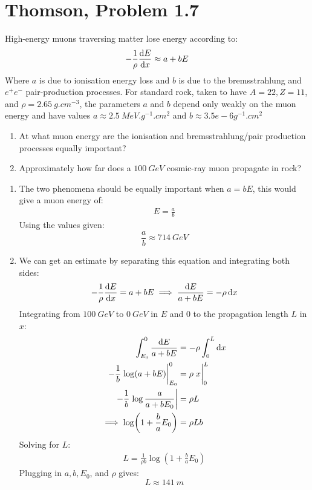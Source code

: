 \documentclass[12pt]{article}
\begin{document}
\section{Thomson, Problem 1.7}
\begin{problem}
  High-energy muons traversing matter lose energy according to:
  \begin{align*}
    -\frac1\rho\dv{E}{x}\approx a+bE
  \end{align*}
  Where $a$ is due to ionisation energy loss and $b$ is due to the bremsstrahlung and $e^+e^-$ pair-production processes. For standard rock, taken to have $A=22, Z=11$, and $\rho=\SI{2.65}{g.cm^{-3}}$, the parameters $a$ and $b$ depend only weakly on the muon energy and have values $a\approx\SI{2.5}{MeV.g^{-1}.cm^{2}}$ and $b\approx{3.5e-6}{g^{-1}.cm^{2}}$
  \begin{enumerate}[label = (\alph*)]
  \item At what muon energy are the ionisation and bremsstrahlung/pair production processes equally important?
  \item Approximately how far does a $\SI{100}{GeV}$ cosmic-ray muon propagate in rock?
  \end{enumerate}
\end{problem}
\begin{enumerate}[label = (\alph*)]
\item The two phenomena should be equally important when $a=bE$, this would give a muon energy of:
  \begin{align*}
    E=\frac{a}{b}
  \end{align*}
  Using the values given:
  \begin{equation}
    \label{eq:p3a}
    \frac{a}{b}\approx\SI{714}{GeV}
  \end{equation}
\item We can get an estimate by separating this equation and integrating both sides:
  \begin{align*}
    -\frac1\rho\dv{E}{x}=a+bE\implies
    \frac{\dd{E}}{a+bE}=-\rho\dd{x}
  \end{align*}
  Integrating from $\SI{100}{GeV}$ to $\SI{0}{GeV}$ in $E$ and $0$ to the propagation length $L$ in $x$:
  \begin{align*}
    \int_{E_0}^0\frac{\dd{E}}{a+bE}&=-\rho\int_0^L\dd{x}\\
    -\frac1b\eval{\log(a+bE)}^0_{E_0}&=\rho\eval{x}_0^L\\
    -\frac1b\eval{\log\frac{a}{a+bE_0}}&=\rho L\\
    \implies\log(1+\frac{b}{a}E_0)&=\rho Lb
  \end{align*}
  Solving for $L$:
  \begin{align*}
    L=\frac1{\rho b}\log(1+\frac{b}{a}E_0)
  \end{align*}
  Plugging in $a,b,E_0$, and $\rho$ gives:
  \begin{equation}
    \label{eq:p3b}
    \boxed{L\approx\SI{141}{m}}
  \end{equation}
\end{enumerate}
\end{document}
